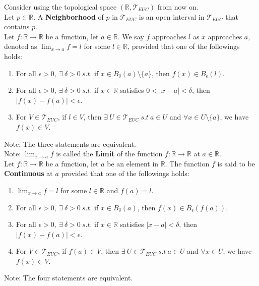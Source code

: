 \documentclass[11pt]{article}
\newcommand{\R}{\mathbb{R}}
\newcommand{\T}{\mathcal{T}}
\newcommand{\note}{\color{gray}Note: \color{black}}
\begin{document}
		\hfill\break
		\noindent \color{red} Consider using the topological space $(\R,\T_{EUC})$ from now on. \color{black} \\

		\noindent Let $p \in \R$. A \textbf{Neighborhood} of $p$ in $\T_{EUC}$ is an open interval in $\T_{EUC}$ that contains $p$.\\
		
		\noindent Let $f:\R \to \R$ be a function, let $a \in \R$. We say $f$ approaches $l$ as $x$ approaches $a$, denoted as $\lim_{x \to a} f = l$ for some $l \in \R$, provided that one of the followings holds:
		\begin{enumerate}[topsep=3pt,itemsep=-1ex,partopsep=1ex,parsep=1ex]
			\item For all $\epsilon >0, \ \exists \ \delta>0 \ s.t.$ if $x \in B_{\delta}(a) \setminus \{a \}$, then $f(x) \in B_{\epsilon}(l)$.
			\item For all $\epsilon >0, \ \exists \ \delta >0 \ s.t.$ if $x\in \R $ satisfies $0< |x-a| < \delta$, then $| f(x)-f(a) | < \epsilon$.
			\item For $V \in \T_{EUC}$, if $l \in V$, then $\exists \ U \in \T_{EUC} \ s.t \ a \in U$ and $\forall x \in U\setminus \{a \}$, we have $f(x) \in V$.
		\end{enumerate}
			\note The three statements are equivalent.\\
		\note $\lim_{x \to a} f$ is called the \textbf{Limit} of the function $f:\R \to \R$ at $a \in \R$.\\

		
		\noindent Let $f:\R \to \R$ be a function, let $a$ be an element in $\R$. The function $f$ is said to be \textbf{Continuous} at $a$ provided that one of the followings holds:
		\begin{enumerate}[topsep=3pt,itemsep=-1ex,partopsep=1ex,parsep=1ex]
			\item $\lim_{x \to a} f = l$ for some $l \in \R$ and $f(a)=l$.
			\item For all $\epsilon>0, \ \exists \ \delta>0 \ s.t.$ if $x \in B_{\delta}(a)$, then $f(x) \in B_{\epsilon}(f(a))$.
			\item For all $\epsilon >0, \ \exists \ \delta >0 \ s.t.$ if $x \in \R$ satisfies $| x-a | < \delta$, then $| f(x)-f(a) | < \epsilon$.
			\item For $V \in \T_{EUC}$, if $f(a) \in V$, then $\exists \ U \in \T_{EUC} \ s.t \ a \in U$ and $\forall x \in U$, we have $f(x) \in V$.
		\end{enumerate}
		\note The four statements are equivalent.\\
		
\end{document}
